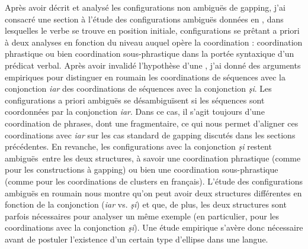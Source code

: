 Après avoir décrit et analysé les configurations non ambiguës de gapping, j’ai consacré une section à l’étude des configurations ambiguës données en , dans lesquelles le verbe se trouve en position initiale, configurations se prêtant a priori à deux analyses en fonction du niveau auquel opère la coordination : coordination phrastique ou bien coordination sous-phrastique dans la portée syntaxique d’un prédicat verbal. Après avoir invalidé l’hypothèse d’une , j’ai donné des arguments empiriques pour distinguer en roumain les coordinations de séquences avec la conjonction \textit{iar} des coordinations de séquences avec la conjonction \textit{şi}. Les configurations a priori ambiguës se désambiguïsent si les séquences sont coordonnées par la conjonction \textit{iar}. Dans ce cas, il s’agit toujours d’une coordination de phrases, dont une fragmentaire, ce qui nous permet d’aligner ces coordinations avec \textit{iar} sur les cas standard de gapping discutés dans les sections précédentes. En revanche, les configurations avec la conjonction \textit{şi} restent ambiguës~entre les deux structures, à savoir une coordination phrastique (comme pour les constructions à gapping) ou bien une coordination sous-phrastique (comme pour les coordinations de clusters en français). L’étude des configurations ambiguës en roumain nous montre qu’on peut avoir deux structures différentes en fonction de la conjonction (\textit{iar} vs. \textit{şi}) et que, de plus, les deux structures sont parfois nécessaires pour analyser un même exemple (en particulier, pour les coordinations avec la conjonction \textit{şi}). Une étude empirique s’avère donc nécessaire avant de postuler l’existence d’un certain type d’ellipse dans une langue.

 